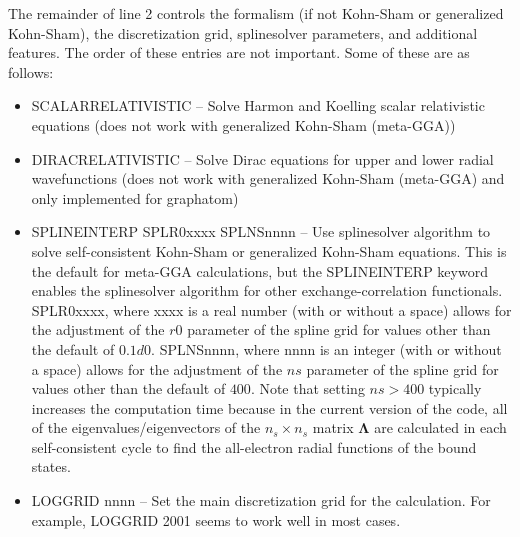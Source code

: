 \documentclass[11pt]{article}
\begin{document}
\begin{itemize}
		
		The remainder of line 2 controls the formalism (if not Kohn-Sham or
		generalized Kohn-Sham), the discretization grid, splinesolver parameters,
		and additional features.  The order of these entries are not important.
		Some of these are as follows:
		\begin{itemize}
		\item SCALARRELATIVISTIC --   Solve Harmon and Koelling scalar relativistic
		  equations  (does not work with generalized Kohn-Sham (meta-GGA))
		\item DIRACRELATIVISTIC  -- Solve Dirac equations for upper and lower 
		  radial wavefunctions (does not work with generalized Kohn-Sham (meta-GGA)
		  and only implemented for graphatom)
		\item SPLINEINTERP SPLR0xxxx  SPLNSnnnn -- Use splinesolver algorithm
		  to solve self-consistent Kohn-Sham or generalized  Kohn-Sham equations.
		  This is the default  for meta-GGA calculations, but the SPLINEINTERP 
		  keyword enables the splinesolver algorithm for other exchange-correlation
		  functionals. SPLR0xxxx, where xxxx is a real number (with or without
		  a space) allows for the adjustment of the $r0$ parameter of the spline
		  grid for values other than the default of $0.1d0$.
		    SPLNSnnnn, where nnnn is an integer (with or without
		  a space) allows for the adjustment of the $ns$ parameter of the spline
		  grid for values other than the default of $400$.
                  Note that setting $ns>400$ typically increases
                  the computation time because in the current version
                  of the code, all of the eigenvalues/eigenvectors
                  of the $n_s \times n_s$ matrix $\boldsymbol{\Lambda}$ are
                  calculated in each self-consistent cycle to
                  find the all-electron radial functions of the 
                  bound states. 
		\item LOGGRID  nnnn   --  Set the main discretization grid for the
		  calculation.   For example,  LOGGRID 2001 seems to work well in most cases.
		\end{itemize}
		

\end{itemize}
\end{document}
